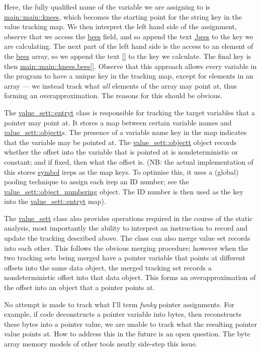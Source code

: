 \documentclass{article}
\begin{document}
Here, the fully qualified name of the variable we are assigning to is
\url{main::main::knees}, which becomes the starting point for the string
key in the value tracking map. We then interpret the left hand side of the
assignment, observe that we access the \url{bees} field, and so append the
text \url{.bees} to the key we are calculating. The next part of the left
hand side is the access to an element of the \url{bees} array, so we
append the text \url{[]} to the key we calculate. The final key is then
\url{main::main::knees.bees[]}. Observe that this approach allows every
variable in the program to have a unique key in the tracking map, except for
elements in an array --- we instead track what \textit{all} elements of the
array may point at, thus forming an overapproximation. The reasons for this
should be obvious.

The \url{value_sett::entryt} class is responsible for tracking the target
variables that a pointer may point at. It stores a map between certain variable
names and \url{value_sett::objectt}s. The presence of a variable name key
in the map indicates that the variable may be pointed at. The
\url{value_sett::objectt} object records whether the offset into the
variable that is pointed at is nondeterministic or constant; and if fixed,
then what the offset is. (NB: the actual implementation of this stores
\url{symbol} ireps as the map keys. To optimise this, it uses a (global)
pooling technique to assign each irep an ID number; see the
\url{value_sett::object_numbering} object. The ID number is then used
as the key into the \url{value_sett::entryt} map).

The \url{value_sett} class also provides operations required in the course
of the static analysis, most importantly the ability to interpret an instruction
to record and update the tracking described above. The class can also merge
value set records into each other. This follows the obvious merging procedure;
however when the two tracking sets being merged have a pointer variable
that points at different offsets into the same data object, the merged
tracking set records a nondeterministic offset into that data object. This
forms an overapproximation of the offset into an object that a pointer points
at.

No attempt is made to track what I'll term \textit{funky} pointer assignments.
For example, if code deconstructs a pointer variable into bytes, then
reconstructs these bytes into a pointer value, we are unable to track
what the resulting pointer value points at. How to address this in the future
is an open question. The byte array memory models of other tools neatly
side-step this issue.
\end{document}
